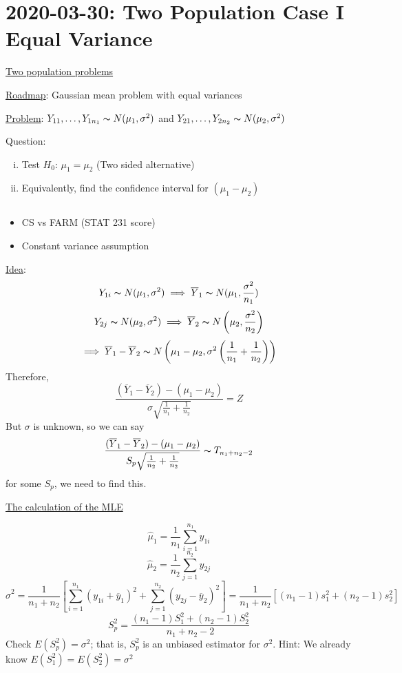 \section{2020-03-30: Two Population Case I Equal Variance}
\underline{Two population problems}

\underline{Roadmap}: Gaussian mean problem with equal variances

\underline{Problem}: $ Y_{11},\ldots ,Y_{1n_1} \thicksim N(\mu_1,\sigma^2) $ and
$ Y_{21},\ldots ,Y_{2n_2} \thicksim N(\mu_2,\sigma^2) $

Question:
\begin{enumerate}[(i)]
    \item Test $ H_0 $: $ \mu_1=\mu_2 $ (Two sided alternative)
    \item Equivalently, find the confidence interval for $ (\mu_1-\mu_2) $
\end{enumerate}

\begin{exbox}
    \begin{example} $ \; $
        \begin{itemize}
            \item CS vs FARM (STAT 231 score)
            \item Constant variance assumption
        \end{itemize}
    \end{example}
\end{exbox}

\underline{Idea}:
\[ Y_{1i} \thicksim N(\mu_1,\sigma^2)\implies \overline{Y}_1 \thicksim N(\mu_1,\frac{\sigma^2}{n_1} ) \]
\[ Y_{2j} \thicksim N(\mu_2,\sigma^2)\implies \overline{Y}_2 \thicksim N\left( \mu_2,\frac{\sigma^2}{n_2} \right) \]
\[ \implies \overline{Y}_1-\overline{Y}_2
    \thicksim N\left(\mu_1-\mu_2,\sigma^2\left( \frac{1}{n_1} +\frac{1}{n_2} \right)\right) \]
Therefore,
\[ \frac{(\overline{Y}_1-\overline{Y}_2)-(\mu_1-\mu_2)}{\sigma \sqrt{\frac{1}{n_1}+\frac{1}{n_2}}}=Z  \]
But $ \sigma $ is unknown, so we can say
\[ \frac{(\overline{Y}_1-\overline{Y}_2)-(\mu_1-\mu_2)}{S_p\sqrt{\frac{1}{n_2}+\frac{1}{n_2}}}
    \thicksim T_{n_1+n_2-2} \]
for some $ S_p $, we need to find this.

\underline{The calculation of the MLE}

\[ \hat{\mu}_1=\frac{1}{n_1} \sum\limits_{i=1}^{n_1} y_{1i} \]
\[ \hat{\mu}_2=\frac{1}{n_2} \sum\limits_{j=1}^{n_2} y_{2j} \]
\[ \hat{\sigma}^2=\frac{1}{n_1+n_2}\left[ \sum\limits_{i=1}^{n_1}(y_{1i}+\overline{y}_1)^2+ \sum\limits_{j=1}^{n_2}(y_{2j}-\overline{y}_2)^2\right]
    =\frac{1}{n_1+n_2} \left[ (n_1-1)s_1^2+(n_2-1)s_2^2  \right] \]
\[ S_p^2=\frac{(n_1-1)S_1^2+(n_2-1)S_2^2}{n_1+n_2-2} \]
Check $ E(S_p^2)=\sigma^2 $; that is, $ S_p^2 $ is an unbiased estimator
for $ \sigma^2 $. Hint: We already know $ E(S_1^2)=E(S_2^2)=\sigma^2 $

